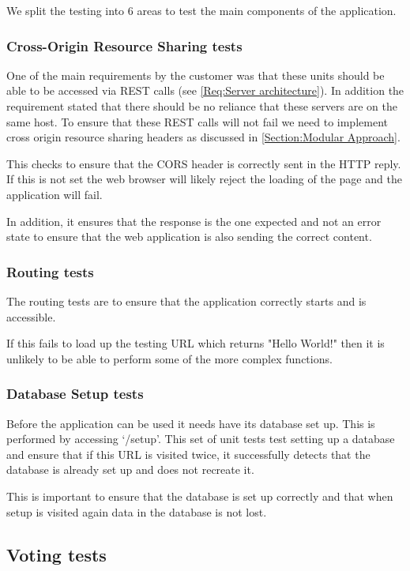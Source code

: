 We split the testing into 6 areas to test the main components of the application.

\subsubsection{Cross-Origin Resource Sharing tests}

One of the main requirements by the customer was that these units should be able to be accessed via REST calls (see \cref{Req:Server architecture}). In addition the requirement stated that there should be no reliance that these servers are on the same host. To ensure that these REST calls will not fail we need to implement cross origin resource sharing headers as discussed in \autoref{Section:Modular Approach}.

This checks to ensure that the CORS header is correctly sent in the HTTP reply. If this is not set the web browser will likely reject the loading of the page and the application will fail.

In addition, it ensures that the response is the one expected and not an error state to ensure that the web application is also sending the correct content.

\subsubsection{Routing tests}

The routing tests are to ensure that the application correctly starts and is accessible.

If this fails to load up the testing URL which returns "Hello World!" then it is unlikely to be able to perform some of the more complex functions.

\subsubsection{Database Setup tests}

Before the application can be used it needs have its database set up. This is performed by accessing `/setup'. This set of unit tests test setting up a database and ensure that if this URL is visited twice, it successfully detects that the database is already set up and does not recreate it. 

This is important to ensure that the database is set up correctly and that when setup is visited again data in the database is not lost.

\subsection{Voting tests}


